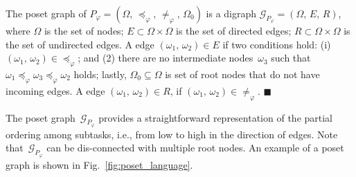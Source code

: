 \begin{definition}\label{def:poset-graph}
The poset graph of $P_{\varphi}=(\Omega,\,\preceq_{\varphi},\,\neq_{\varphi},
\,\Omega_0)$ is a digraph $\mathcal{G}_{P_\varphi}=(\Omega,\,E,\,R)$,
where $\Omega$ is the set of nodes;
$E\subset \Omega \times \Omega$ is the set of directed edges;
$R\subset \Omega \times \Omega$ is the set of undirected edges.
A edge $(\omega_1,\,\omega_2)\in E$ if two conditions hold:
(i) $(\omega_1,\, \omega_2)\in \preceq_{\varphi}$;
{and} (2) there are no intermediate nodes~$\omega_3$ such that
$\omega_1\preceq_{\varphi} \omega_3 \preceq_{\varphi} \omega_2$ holds;
lastly, $\Omega_0\subseteq \Omega$ is set of root nodes that do not have
incoming edges. A edge $(\omega_1,\,\omega_2)\in R$, if $(\omega_1,\, \omega_2)\in \neq_{\varphi}$.
\hfill $\blacksquare$
 \end{definition}

The poset graph~$\mathcal{G}_{P_\varphi}$ provides a straightforward
representation of the partial ordering among subtasks,
i.e., from low to high in the direction of edges.
Note that~$\mathcal{G}_{P_\varphi}$ can be dis-connected with multiple root nodes.
An example of a poset graph is shown in Fig.~\ref{fig:poset_language}.

